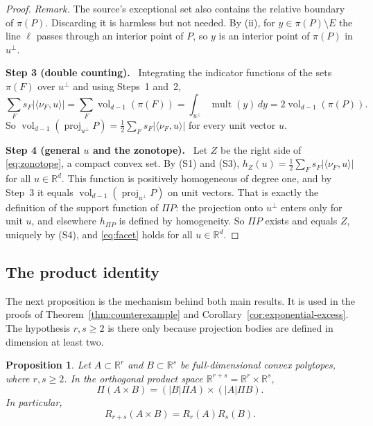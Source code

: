 \documentclass[11pt]{article}
\newtheorem{proposition}[theorem]{Proposition}
\newcommand{\R}{\mathbb R}
\DeclareMathOperator{\vol}{vol}
\DeclareMathOperator{\proj}{proj}
\DeclareMathOperator{\mult}{mult}
\newcommand{\step}[1]{\par\smallskip\noindent\textbf{#1}\ }
\begin{document}
\begin{proof}
\emph{Remark.} The source's exceptional set also contains the relative
boundary of \(\pi(P)\). Discarding it is harmless but not needed. By (ii),
for \(y\in\pi(P)\setminus E\) the line \(\ell\) passes through an interior
point of \(P\), so \(y\) is an interior point of \(\pi(P)\) in \(u^\perp\).

\step{Step 3 (double counting).} Integrating the indicator functions of
the sets \(\pi(F)\) over \(u^\perp\) and using Steps~1 and~2,
\[
 \sum_F s_F|\langle\nu_F,u\rangle|
 =\sum_F\vol_{d-1}(\pi(F))
 =\int_{u^\perp}\mult(y)\,dy
 =2\vol_{d-1}(\pi(P)).
\]
So \(\vol_{d-1}(\proj_{u^\perp}P)=\tfrac12\sum_Fs_F|\langle\nu_F,u\rangle|\)
for every unit vector \(u\).

\step{Step 4 (general \(u\) and the zonotope).} Let \(Z\) be the right side
of \eqref{eq:zonotope}, a compact convex set. By (S1) and (S3),
\(h_Z(u)=\tfrac12\sum_Fs_F|\langle\nu_F,u\rangle|\) for all \(u\in\R^d\).
This function is positively homogeneous of degree one, and by Step~3 it
equals \(\vol_{d-1}(\proj_{u^\perp}P)\) on unit vectors. That is exactly
the definition of the support function of \(\Pi P\): the projection onto
\(u^\perp\) enters only for unit \(u\), and elsewhere \(h_{\Pi P}\) is
defined by homogeneity. So \(\Pi P\) exists and equals \(Z\), uniquely by
(S4), and \eqref{eq:facet} holds for all \(u\in\R^d\).
\end{proof}

\subsection{The product identity}

The next proposition is the mechanism behind both main results. It is used
in the proofs of Theorem~\ref{thm:counterexample} and
Corollary~\ref{cor:exponential-excess}. The hypothesis \(r,s\ge2\) is there
only because projection bodies are defined in dimension at least two.

\begin{proposition}\label{prop:product}
Let \(A\subset\R^r\) and \(B\subset\R^s\) be full-dimensional convex
polytopes, where \(r,s\ge2\). In the orthogonal product space
\(\R^{r+s}=\R^r\times\R^s\),
\begin{equation}\label{eq:product-body}
 \Pi(A\times B)=(|B|\Pi A)\times(|A|\Pi B).
\end{equation}
In particular,
\begin{equation}\label{eq:multiplicative}
 R_{r+s}(A\times B)=R_r(A)R_s(B).
\end{equation}
\end{proposition}
\end{document}
